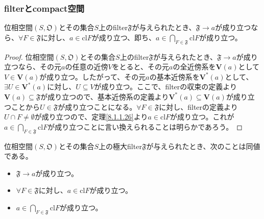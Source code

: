 \documentclass[dvipdfmx]{jsarticle}
\begin{document}
\subsubsection{filterとcompact空間}%
\begin{thm}\label{8.1.8.16}
位相空間$\left( S,\mathfrak{O} \right)$とその集合$S$上のfilter$\mathfrak{F}$が与えられたとき、$\mathfrak{F} \rightarrow a$が成り立つなら、$\forall F\in \mathfrak{F}$に対し、$a \in {\mathrm{cl}}F$が成り立つ、即ち、$a \in \bigcap_{F\in \mathfrak{F}} {{\mathrm{cl}}F}$が成り立つ。
\end{thm}
\begin{proof}
位相空間$\left( S,\mathfrak{O} \right)$とその集合$S$上のfilter$\mathfrak{F}$が与えられたとき、$\mathfrak{F} \rightarrow a$が成り立つなら、その元$a$の任意の近傍$V$をとると、その元$a$の全近傍系を$\mathbf{V}(a)$として$V \in \mathbf{V}(a)$が成り立つ。したがって、その元$a$の基本近傍系を$\mathbf{V}^{*}(a)$として、$\exists U \in \mathbf{V}^{*}(a)$に対し、$U \subseteq V$が成り立つ。ここで、filterの収束の定義より$\mathbf{V}(a)\subseteq \mathfrak{F}$が成り立つので、基本近傍系の定義より$\mathbf{V}^{*}(a) \subseteq \mathbf{V}(a)$が成り立つことから$U \in \mathfrak{F}$が成り立つことになる。$\forall F \in \mathfrak{F}$に対し、filterの定義より$U \cap F \neq \emptyset$が成り立つので、定理\ref{8.1.1.26}より$a \in {\mathrm{cl}}F$が成り立つ。これが$a \in \bigcap_{F \in \mathfrak{F}} {{\mathrm{cl}}F}$が成り立つことに言い換えられることは明らかであろう。
\end{proof}
\begin{thm}\label{8.1.8.17}
位相空間$\left( S,\mathfrak{O} \right)$とその集合$S$上の極大filter$\mathfrak{F}$が与えられたとき、次のことは同値である。
\begin{itemize}
\item
  $\mathfrak{F} \rightarrow a$が成り立つ。
\item
  $\forall F\in \mathfrak{F}$に対し、$a \in {\mathrm{cl}}F$が成り立つ。
\item
  $a \in \bigcap_{F \in \mathfrak{F}} {{\mathrm{cl}}F}$が成り立つ。
\end{itemize}
\end{thm}
\end{document}
